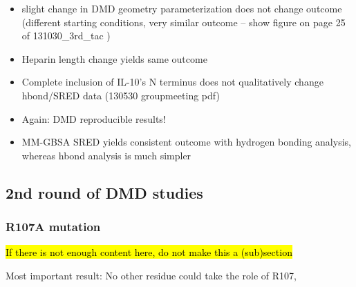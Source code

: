 \begin{itemize}

\item slight change in DMD geometry parameterization does not change outcome (different starting conditions, very similar outcome -- show figure on page 25 of 131030_3rd_tac )
\item Heparin length change yields same outcome
\item Complete inclusion of IL-10's N terminus does not qualitatively change hbond/SRED data (130530 groupmeeting pdf)
\item Again: DMD reproducible results!
\item MM-GBSA SRED yields consistent outcome with hydrogen bonding analysis,
whereas hbond analysis is much simpler

\end{itemize}

\subsection{2nd round of DMD studies}

\subsubsection{R107A mutation}

\hl{If there is not enough content here, do not make this a (sub)section}

Most important result: No other residue could take the role of R107,

